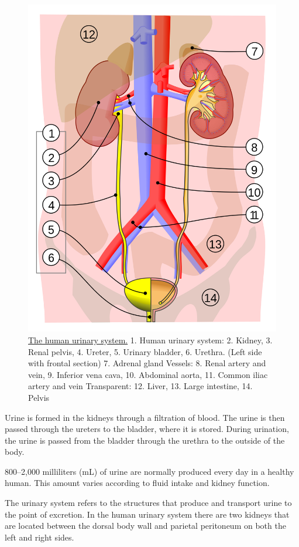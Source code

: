\begin{figure}

{\centering \includegraphics[width=0.7\linewidth]{./figures/excretory/Urinary_system} 

}

\caption{\href{https://commons.wikimedia.org/wiki/File:Urinary_system.svg}{The human urinary system.} 1. Human urinary system: 2. Kidney, 3. Renal pelvis, 4. Ureter, 5. Urinary bladder, 6. Urethra. (Left side with frontal section) 7. Adrenal gland Vessels: 8. Renal artery and vein, 9. Inferior vena cava, 10. Abdominal aorta, 11. Common iliac artery and vein Transparent: 12. Liver, 13. Large intestine, 14. Pelvis}\label{fig:urinarysystem}
\end{figure}

Urine is formed in the kidneys through a filtration of blood. The urine is then passed through the ureters to the bladder, where it is stored. During urination, the urine is passed from the bladder through the urethra to the outside of the body.

800--2,000 milliliters (mL) of urine are normally produced every day in a healthy human. This amount varies according to fluid intake and kidney function.

The urinary system refers to the structures that produce and transport urine to the point of excretion. In the human urinary system there are two kidneys that are located between the dorsal body wall and parietal peritoneum on both the left and right sides.

